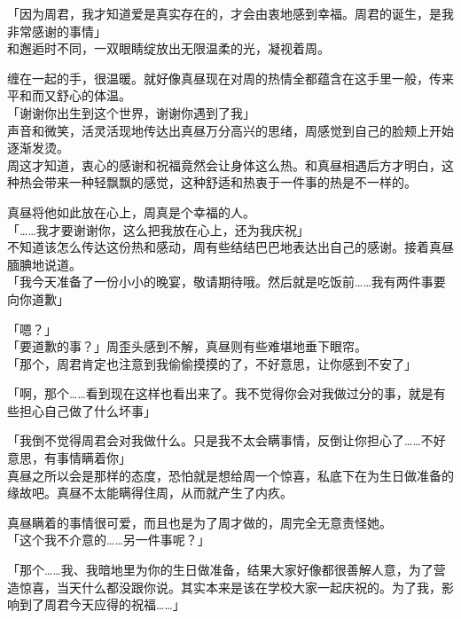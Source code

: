 「因为周君，我才知道爱是真实存在的，才会由衷地感到幸福。周君的诞生，是我非常感谢的事情」\\

和邂逅时不同，一双眼睛绽放出无限温柔的光，凝视着周。

缠在一起的手，很温暖。就好像真昼现在对周的热情全都蕴含在这手里一般，传来平和而又舒心的体温。\\

「谢谢你出生到这个世界，谢谢你遇到了我」\\

声音和微笑，活灵活现地传达出真昼万分高兴的思绪，周感觉到自己的脸颊上开始逐渐发烫。\\

周这才知道，衷心的感谢和祝福竟然会让身体这么热。和真昼相遇后方才明白，这种热会带来一种轻飘飘的感觉，这种舒适和热衷于一件事的热是不一样的。

真昼将他如此放在心上，周真是个幸福的人。\\

「……我才要谢谢你，这么把我放在心上，还为我庆祝」\\

不知道该怎么传达这份热和感动，周有些结结巴巴地表达出自己的感谢。接着真昼腼腆地说道。\\

「我今天准备了一份小小的晚宴，敬请期待哦。然后就是吃饭前……我有两件事要向你道歉」

「嗯？」\\

「要道歉的事？」周歪头感到不解，真昼则有些难堪地垂下眼帘。\\

「那个，周君肯定也注意到我偷偷摸摸的了，不好意思，让你感到不安了」

「啊，那个……看到现在这样也看出来了。我不觉得你会对我做过分的事，就是有些担心自己做了什么坏事」

「我倒不觉得周君会对我做什么。只是我不太会瞒事情，反倒让你担心了……不好意思，有事情瞒着你」\\

真昼之所以会是那样的态度，恐怕就是想给周一个惊喜，私底下在为生日做准备的缘故吧。真昼不太能瞒得住周，从而就产生了内疚。

真昼瞒着的事情很可爱，而且也是为了周才做的，周完全无意责怪她。\\

「这个我不介意的……另一件事呢？」

「那个……我、我暗地里为你的生日做准备，结果大家好像都很善解人意，为了营造惊喜，当天什么都没跟你说。其实本来是该在学校大家一起庆祝的。为了我，影响到了周君今天应得的祝福……」

